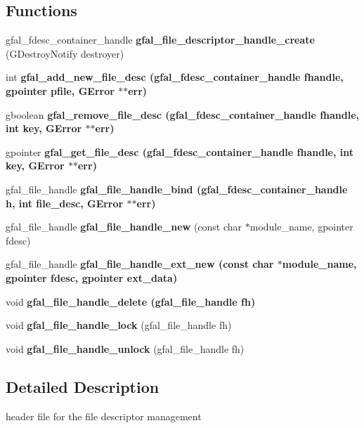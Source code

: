 \subsection*{Functions}
\begin{CompactItemize}
\item 
gfal\_\-fdesc\_\-container\_\-handle \textbf{gfal\_\-file\_\-descriptor\_\-handle\_\-create} (GDestroy\-Notify destroyer)\label{gfal__common__filedescriptor_8h_13934d51ad328aabb0721ef7793ad233}

\item 
int \bf{gfal\_\-add\_\-new\_\-file\_\-desc} (gfal\_\-fdesc\_\-container\_\-handle fhandle, gpointer pfile, GError $\ast$$\ast$err)
\item 
gboolean \bf{gfal\_\-remove\_\-file\_\-desc} (gfal\_\-fdesc\_\-container\_\-handle fhandle, int key, GError $\ast$$\ast$err)
\item 
gpointer \bf{gfal\_\-get\_\-file\_\-desc} (gfal\_\-fdesc\_\-container\_\-handle fhandle, int key, GError $\ast$$\ast$err)
\item 
gfal\_\-file\_\-handle \bf{gfal\_\-file\_\-handle\_\-bind} (gfal\_\-fdesc\_\-container\_\-handle h, int file\_\-desc, GError $\ast$$\ast$err)
\item 
gfal\_\-file\_\-handle \textbf{gfal\_\-file\_\-handle\_\-new} (const char $\ast$module\_\-name, gpointer fdesc)\label{gfal__common__filedescriptor_8h_5891a96d47726421216140dba73f5e27}

\item 
gfal\_\-file\_\-handle \bf{gfal\_\-file\_\-handle\_\-ext\_\-new} (const char $\ast$module\_\-name, gpointer fdesc, gpointer ext\_\-data)
\item 
void \bf{gfal\_\-file\_\-handle\_\-delete} (gfal\_\-file\_\-handle fh)
\item 
void \textbf{gfal\_\-file\_\-handle\_\-lock} (gfal\_\-file\_\-handle fh)\label{gfal__common__filedescriptor_8h_6d367603c796be72a8444434ba19cf6b}

\item 
void \textbf{gfal\_\-file\_\-handle\_\-unlock} (gfal\_\-file\_\-handle fh)\label{gfal__common__filedescriptor_8h_8346baf190ac219cfc91ac45e0576449}

\end{CompactItemize}


\subsection{Detailed Description}
header file for the file descriptor management 

